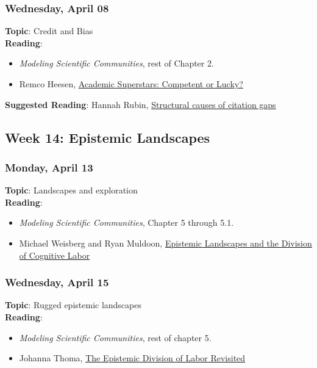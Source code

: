 \documentclass[
  letterpaper,
  DIV=11,
  numbers=noendperiod]{scrartcl}
\providecommand{\tightlist}{%
  \setlength{\itemsep}{0pt}\setlength{\parskip}{0pt}}
\begin{document}
\subsubsection{Wednesday, April 08}\label{wednesday-april-08}

\textbf{Topic}: Credit and Bias\\
\textbf{Reading}:

\begin{itemize}
\tightlist
\item
  \emph{Modeling Scientific Communities}, rest of Chapter 2.
\item
  Remco Heesen,
  \href{https://link.springer.com/article/10.1007/s11229-016-1146-5}{Academic
  Superstars: Competent or Lucky?}
\end{itemize}

\textbf{Suggested Reading}: Hannah Rubin,
\href{https://link.springer.com/article/10.1007/s11098-021-01765-3}{Structural
causes of citation gaps}

\subsection{Week 14: Epistemic
Landscapes}\label{week-14-epistemic-landscapes}

\subsubsection{Monday, April 13}\label{monday-april-13}

\textbf{Topic}: Landscapes and exploration\\
\textbf{Reading}:

\begin{itemize}
\tightlist
\item
  \emph{Modeling Scientific Communities}, Chapter 5 through 5.1.
\item
  Michael Weisberg and Ryan Muldoon,
  \href{https://www.jstor.org/stable/10.1086/644786?seq=1}{Epistemic
  Landscapes and the Division of Cognitive Labor}
\end{itemize}

\subsubsection{Wednesday, April 15}\label{wednesday-april-15}

\textbf{Topic}: Rugged epistemic landscapes\\
\textbf{Reading}:

\begin{itemize}
\tightlist
\item
  \emph{Modeling Scientific Communities}, rest of chapter 5.
\item
  Johanna Thoma,
  \href{https://eprints.lse.ac.uk/88129/1/Thoma_Division\%20of\%20Labour_Accepted.pdf}{The
  Epistemic Division of Labor Revisited}
\end{itemize}
\end{document}
